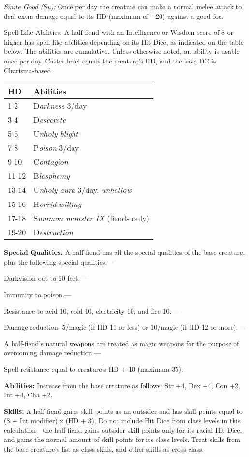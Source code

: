 \documentclass{article}
\begin{document}
\textit{Smite Good (Su): }Once per day the creature can make a normal melee attack 
to deal extra damage equal to its HD (maximum of +20) against a good foe.

Spell-Like Abilities: A half-fiend with an Intelligence or Wisdom score of 8 or 
higher has spell-like abilities depending on its Hit Dice, as indicated on the 
table below. The abilities are cumulative\textit{. }Unless otherwise noted, an 
ability is usable once per day. Caster level equals the creature's HD, and the 
save DC is Charisma-based.

\begin{tabular}{|>{\raggedright}p{23pt}|>{\raggedright}p{133pt}|}
\hline
H\textbf{D} & A\textbf{bilities}\tabularnewline
\hline
1-2 & D\textit{arkness }3/day\tabularnewline
\hline
3-4 & D\textit{esecrate}\tabularnewline
\hline
5-6 & U\textit{nholy blight}\tabularnewline
\hline
7-8 & P\textit{oison }3/day\tabularnewline
\hline
9-10 & C\textit{ontagion}\tabularnewline
\hline
11-12 & B\textit{lasphemy}\tabularnewline
\hline
13-14 & U\textit{nholy aura }3/day, \textit{unhallow}\tabularnewline
\hline
15-16 & H\textit{orrid wilting}\tabularnewline
\hline
17-18 & S\textit{ummon monster IX }(fiends only)\tabularnewline
\hline
19-20 & D\textit{estruction}\tabularnewline
\hline
\end{tabular}

\textbf{Special Qualities: }A half-fiend has all the special qualities of the base 
creature, plus the following special qualities.---

Darkvision out to 60 feet.---

Immunity to poison.---

Resistance to acid 10, cold 10, electricity 10, and fire 10.---

Damage reduction: 5/magic (if HD 11 or less) or 10/magic (if HD 12 or more).---

A half-fiend's natural weapons are treated as magic weapons for the purpose of 
overcoming damage reduction.---

Spell resistance equal to creature's HD + 10 (maximum 35).

\textbf{Abilities:} Increase from the base creature as follows: Str +4, Dex +4, 
Con +2, Int +4, Cha +2.

\textbf{Skills:} A half-fiend gains skill points as an outsider and has skill points 
equal to (8 + Int modifier) x $ $(HD + 3). Do not include Hit Dice from class levels 
in this calculation---the half-fiend gains outsider skill points only for its racial 
Hit Dice, and gains the normal amount of skill points for its class levels. Treat 
skills from the base creature's list as class skills, and other skills as cross-class.
\end{document}

